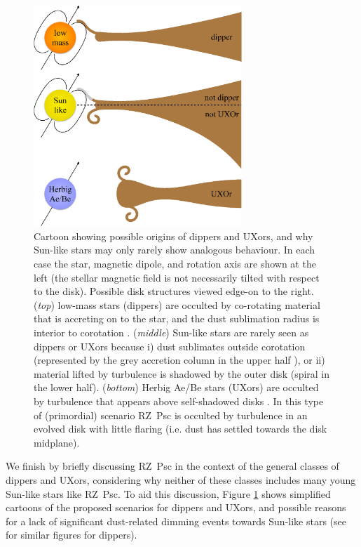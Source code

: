 \documentclass[]{rsos}
\begin{document}
\begin{figure}
  \begin{center}
    \hspace{-0.5cm} \includegraphics[width=0.7\textwidth]{figs/cartoon-crop.ps}
    \caption{Cartoon showing possible origins of dippers and UXors, and why Sun-like
      stars may only rarely show analogous behaviour. In each case the star, magnetic
      dipole, and rotation axis are shown at the left (the stellar magnetic field is not
      necessarily tilted with respect to the disk). Possible disk structures viewed
      edge-on to the right. (\emph{top}) low-mass stars (dippers) are occulted by
      co-rotating material that is accreting on to the star, and the dust sublimation
      radius is interior to corotation \cite{2016arXiv160503985B}. (\emph{middle})
      Sun-like stars are rarely seen as dippers or UXors because i) dust sublimates
      outside corotation (represented by the grey accretion column in the upper half
      \cite{2016arXiv160503985B}), or ii) material lifted by turbulence is shadowed by
      the outer disk (spiral in the lower half). (\emph{bottom}) Herbig Ae/Be stars
      (UXors) are occulted by turbulence that appears above self-shadowed disks
      \cite{2003ApJ...594L..47D}. In this type of (primordial) scenario RZ~Psc is
      occulted by turbulence in an evolved disk with little flaring (i.e. dust has
      settled towards the disk midplane).}\label{fig:cartoon}
  \end{center}
\end{figure}

We finish by briefly discussing RZ~Psc in the context of the general classes of dippers
and UXors, considering why neither of these classes includes many young Sun-like stars
like RZ~Psc. To aid this discussion, Figure \ref{fig:cartoon} shows simplified cartoons
of the proposed scenarios for dippers and UXors, and possible reasons for a lack of
significant dust-related dimming events towards Sun-like stars (see
\cite{2016arXiv160503985B} for similar figures for dippers).
\end{document}
